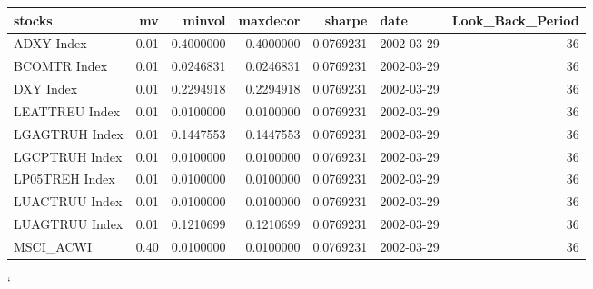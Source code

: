\documentclass[11pt,preprint, authoryear]{elsarticle}
\numberwithin{equation}{section}
\numberwithin{figure}{section}
\numberwithin{table}{section}
\begin{document}
\setcounter{footnote}{0}



\pagestyle{fancy}
\chead{}
\rhead{}
\lfoot{}
\lhead{}
\cfoot{}


\headsep 35pt %




\begin{tabular}{l|r|r|r|r|l|r}
\hline
stocks & mv & minvol & maxdecor & sharpe & date & Look\_Back\_Period\\
\hline
ADXY Index & 0.01 & 0.4000000 & 0.4000000 & 0.0769231 & 2002-03-29 & 36\\
\hline
BCOMTR Index & 0.01 & 0.0246831 & 0.0246831 & 0.0769231 & 2002-03-29 & 36\\
\hline
DXY Index & 0.01 & 0.2294918 & 0.2294918 & 0.0769231 & 2002-03-29 & 36\\
\hline
LEATTREU Index & 0.01 & 0.0100000 & 0.0100000 & 0.0769231 & 2002-03-29 & 36\\
\hline
LGAGTRUH Index & 0.01 & 0.1447553 & 0.1447553 & 0.0769231 & 2002-03-29 & 36\\
\hline
LGCPTRUH Index & 0.01 & 0.0100000 & 0.0100000 & 0.0769231 & 2002-03-29 & 36\\
\hline
LP05TREH Index & 0.01 & 0.0100000 & 0.0100000 & 0.0769231 & 2002-03-29 & 36\\
\hline
LUACTRUU Index & 0.01 & 0.0100000 & 0.0100000 & 0.0769231 & 2002-03-29 & 36\\
\hline
LUAGTRUU Index & 0.01 & 0.1210699 & 0.1210699 & 0.0769231 & 2002-03-29 & 36\\
\hline
MSCI\_ACWI & 0.40 & 0.0100000 & 0.0100000 & 0.0769231 & 2002-03-29 & 36\\
\hline
\end{tabular}

`


\end{document}
